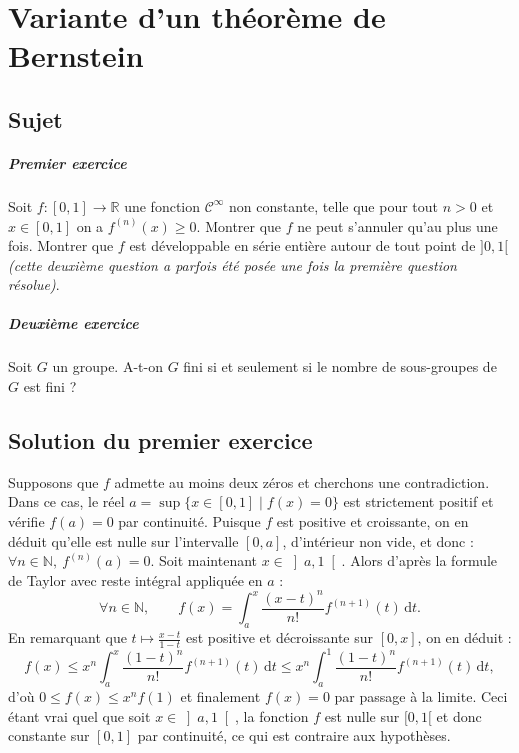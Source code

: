 \chapter{Variante d'un théorème de Bernstein}

\section{Sujet}

\paragraph{Premier exercice}
Soit $f : [0, 1] \rightarrow  \mathbb{R}$ une fonction $\mathscr{C}^{\infty }$ non constante, telle que pour tout $n > 0$ et $x \in [0, 1]$ on a $f^{(n)}(x) \geqslant  0$. Montrer que $f$ ne peut s'annuler qu'au plus une fois. Montrer que $f$ est développable en série entière autour de tout point de $]0, 1[$ \emph{(cette deuxième question a parfois été posée une fois la première question résolue)}.

\paragraph{Deuxième exercice}
Soit $G$ un groupe. A-t-on $G$ fini si et seulement si le nombre de sous-groupes de $G$ est fini ?

\section{Solution du premier exercice} %

Supposons que $f$ admette au moins deux zéros et cherchons une contradiction. Dans ce cas, le réel $a = \sup \{x\in  [0,1] \mid f(x) = 0 \}$ est strictement positif et vérifie $f(a) = 0$ par continuité. Puisque $f$ est positive et croissante, on en déduit qu'elle est nulle sur l'intervalle $[0,a]$, d'intérieur non vide, et donc : $\forall n\in \mathbb{N},\  f^{(n)} (a) = 0$. Soit maintenant $x \in \left]a,1\right[$. Alors d'après la formule de Taylor avec reste intégral appliquée en $a$ :
\[
\forall  n\in \mathbb{N},\qquad
f(x) = \int_a^x \frac{(x-t)^n}{n!} f^{(n+1)}(t) \,\mathrm dt.
\]
En remarquant que $t\mapsto\frac{x-t}{1-t}$ est positive et décroissante sur  $[0,x]$, on en déduit :
\[
f(x) \leqslant x^n \int _{a} ^{x} \frac{(1-t)^{n} }{n!} f^{(n+1)}(t) \,\mathrm{d}t
\leqslant 
x^n \int _{a} ^{1} \frac{(1-t)^{n} }{n!} f^{(n+1)}(t) \,\mathrm{d}t,
\]
d'où $0 \leqslant f(x) \leqslant x^n f(1)$ et finalement $f(x) = 0$ par passage à la limite. Ceci étant vrai quel que soit $x \in \left]a,1\right[$, la fonction $f$ est nulle sur $[0,1[$ et donc constante sur $[0,1]$ par continuité, ce qui est contraire aux hypothèses.\\

